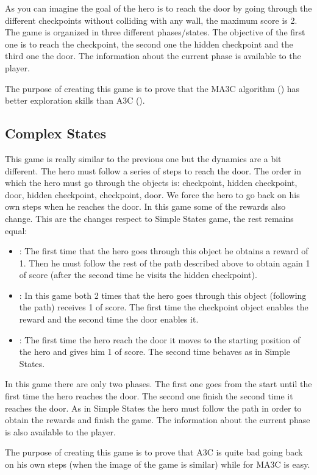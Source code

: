 As you can imagine the goal of the hero is to reach the door by going through the different checkpoints without colliding
with any wall, the maximum score is 2.
The game is organized in three different phases/states.
The objective of the first one is to reach the checkpoint,
the second one the hidden checkpoint and the third one the door.
The information about the current phase is available
to the player.

The purpose of creating this game is to prove that the \ac{MA3C} algorithm () has better exploration
skills than A3C ().

\subsection{Complex States}
This game is really similar to the previous one but the dynamics are a bit different.
The hero must follow a series of steps to reach the door.
The order in which the hero must go through the objects is: checkpoint, hidden checkpoint, door, hidden checkpoint,
checkpoint, door.
We force the hero to go back on his own steps when he reaches the door.
In this game some of the rewards also change.
This are the changes respect to Simple States game, the rest remains equal:
\begin{itemize}
    \item {}: The first time that the hero goes through this object he obtains a reward of 1.
    Then he must follow the rest of the path described above to obtain again 1 of score (after the second time he visits the hidden checkpoint).
    \item {}: In this game both 2 times that the hero goes through this object
    (following the path) receives 1 of score.
    The first time the checkpoint object enables the reward and the second time the door enables it.
    \item {}: The first time the hero reach the door it moves to the starting position of the hero and
    gives him 1 of score.
    The second time behaves as in Simple States.
\end{itemize}

In this game there are only two phases.
The first one goes from the start until the first time the hero reaches the door.
The second one finish the second time it reaches the door.
As in Simple States the hero must follow the path in order to obtain the rewards and finish the game.
The information about the current phase is also available to the player.

The purpose of creating this game is to prove that \ac{A3C} is quite bad going back on his own steps (when the image of the
game is similar) while for \ac{MA3C} is easy.
